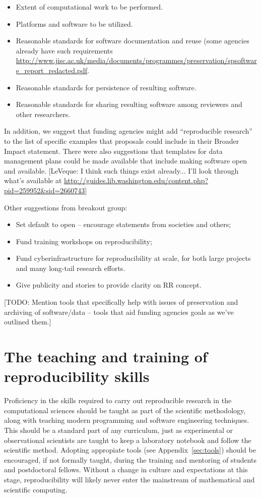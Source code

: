 \documentclass[11pt]{article}
\newcommand{\todo}[1]{{\color{red} [TODO: #1]}}
\newcommand{\comment}[1]{{\color{blue} [#1]}}
\newcommand{\todo}[1]{}
\newcommand{\comment}[1]{}
\begin{document}
\begin{itemize} 
\item Extent of computational work to be performed.
\item Platforms and software to be utilized.
\item Reasonable standards for software documentation and reuse (some agencies
already have such requirements 
\url{http://www.jisc.ac.uk/media/documents/programmes/preservation/spsoftware_report_redacted.pdf}.
\item Reasonable standards for persistence of resulting software.
\item Reasonable standards for sharing resulting software among reviewers and
other researchers.
\end{itemize} 


In addition, we suggest that funding
agencies might add ``reproducible research'' to the list of specific examples
that proposals could include in their Broader Impact statement. There were
also suggestions that templates for data management plans could be made
available that include making software open and available.
\comment{LeVeque: I think such things exist already... I'll look through
what's available at
\url{http://guides.lib.washington.edu/content.php?pid=259952&sid=2660743}}

Other suggestions from breakout group: 
\begin{itemize} 
\item    Set default to open – encourage statements from societies
and others;
\item    Fund training workshops on reproducibility;
\item    Fund cyberinfrastructure for reproducibility at scale, for
both large projects and many long-tail research efforts.
\item    Give publicity and stories to provide clarity on RR concept.
\end{itemize} 


\todo{ Mention tools that specifically help with issues of preservation and
archiving of software/data – tools that aid funding agencies goals as we’ve
outlined them.}

\section{The teaching and training of reproducibility skills}
\label{sec:teaching}

Proficiency in the skills required to carry out
reproducible research in the computational sciences should be taught as part
of the scientific methodology, along with teaching modern programming and
software engineering techniques. This should be a standard part of any
curriculum, just as experimental or observational scientists are taught
to keep a laboratory notebook and follow the scientific method.  
Adopting appropiate tools (see Appendix~\ref{sec:tools}) should be
encouraged, if not formally taught, during the training and mentoring of
students and postdoctoral fellows. Without a change in culture and
expectations at this stage, reproducibility will likely never enter the
mainstream of mathematical and scientific computing.
\end{document}
